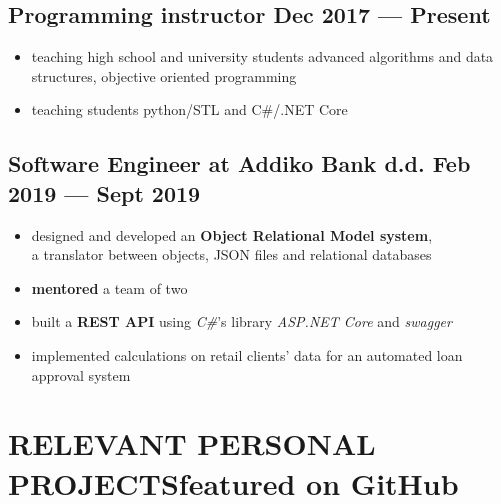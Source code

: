 \documentclass{article}
\begin{document}
\subsection{Programming instructor \hfill Dec 2017 --- Present}
\begin{itemize}
  \itemsep0em
  \item teaching high school and university students advanced algorithms and data structures, objective oriented programming
  \item teaching students python/STL and C\#/.NET Core
\end{itemize}

\subsection{Software Engineer at Addiko Bank d.d. \hfill Feb 2019 --- Sept 2019}
\begin{itemize}
  \itemsep0em
  \item designed and developed an {\bfseries Object Relational Model system},
  \\a translator between objects, JSON files and relational databases
  \item {\bfseries mentored} a team of two
  \item built a {\bfseries REST API} using \textit{C\#}'s library \textit{ASP.NET Core} and \textit{swagger}
  \item implemented calculations on retail clients' data for an automated loan approval system
\end{itemize}

\section{RELEVANT PERSONAL PROJECTS\hfill featured on GitHub}

\end{document}
